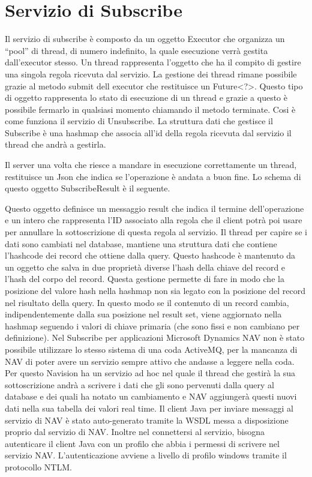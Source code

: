 \section{Servizio di Subscribe}
Il servizio di subscribe è composto da un oggetto Executor che organizza un “pool” di thread, di numero indefinito, la quale esecuzione verrà gestita dall’executor stesso. Un thread rappresenta l’oggetto che ha il compito di gestire una singola regola ricevuta dal servizio. La gestione dei thread rimane possibile grazie al metodo submit dell executor che restituisce un Future<?>. Questo tipo di oggetto rappresenta lo stato di esecuzione di un thread e grazie a questo è possibile fermarlo in qualsiasi momento chiamando il metodo terminate. Cosi è come funziona il servizio di Unsubscribe. La struttura dati che gestisce il Subscribe è una hashmap che associa all’id della regola ricevuta dal servizio il thread che andrà a gestirla. 

Il server una volta che riesce a mandare in esecuzione correttamente un thread, restituisce un Json che indica se l’operazione è andata a buon fine. Lo schema di questo oggetto SubscribeResult è il seguente.
\begin{center}
		{\selectfont
			
		}
\end{center}
Questo oggetto definisce un messaggio result che indica il termine dell’operazione e un intero che rappresenta l’ID associato alla regola che il client potrà poi usare per annullare la sottoscrizione di questa regola al servizio.
Il thread per capire se i dati sono cambiati nel database, mantiene una struttura dati che contiene l’hashcode dei record che ottiene dalla query. Questo hashcode è mantenuto da un oggetto che salva in due proprietà diverse l’hash della chiave del record e l’hash del corpo del record. Questa gestione permette di fare in modo che la posizione del valore hash nella hashmap non sia legato con la posizione del record nel risultato della query. In questo modo se il contenuto di un record cambia, indipendentemente dalla sua posizione nel result set, viene aggiornato nella hashmap seguendo i valori di chiave primaria (che sono fissi e non cambiano per definizione). \newline
Nel Subscribe per applicazioni Microsoft Dynamics NAV non è stato possibile utilizzare lo stesso sistema di una coda ActiveMQ, per la mancanza di NAV di poter avere un servizio sempre attivo che andasse a leggere nella coda. Per questo Navision ha un servizio ad hoc nel quale il thread che gestirà la sua sottoscrizione andrà a scrivere i dati che gli sono pervenuti dalla query al database e dei quali ha notato un cambiamento e NAV aggiungerà questi nuovi dati nella sua tabella dei valori real time. Il client Java per inviare messaggi al servizio di NAV è stato auto-generato tramite la WSDL messa a disposizione proprio dal servizio di NAV. Inoltre nel connettersi al servizio, bisogna autenticare il client Java con un profilo che abbia i permessi di scrivere nel servizio NAV. L’autenticazione avviene a livello di profilo windows tramite il protocollo NTLM. \newline

